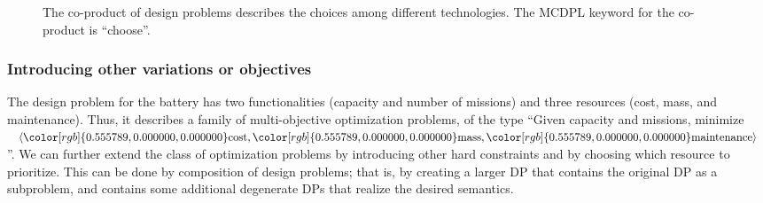 \documentclass[twocolumn,english]{IEEEtran}
\theoremstyle{definition}
\theoremstyle{plain}
\theoremstyle{definition}
\theoremstyle{remark}
\theoremstyle{definition}
\theoremstyle{plain}
\theoremstyle{plain}
\newcommand{\colR}{\color[rgb]{0.555789,0.000000,0.000000}}
\newcommand{\colF}{\color[rgb]{0.094869,0.500000,0.000000}}
\newcommand{\R}[1]{{\colR #1}}
\newcommand{\F}[1]{{\colF #1}}
\begin{document}
\begin{figure}[H]

\smallskip{}

\caption{\label{fig:batteriesbig}The co-product of design problems describes
the choices among different technologies. The MCDPL keyword for the
co-product is ``choose''.}
\end{figure}


\subsubsection*{Introducing other variations or objectives}

The design problem for the battery has two functionalities (\F{capacity}
and \F{number of missions}) and three resources (\R{cost}, \R{mass},
and \R{maintenance}). Thus, it describes a family of multi-objective
optimization problems, of the type ``Given \F{capacity} and \F{missions},
minimize $\left\langle \R{\text{cost}},\R{\text{mass}},\R{\text{maintenance}}\right\rangle $''.
We can further extend the class of optimization problems by introducing
other hard constraints and by choosing which resource to prioritize.
This can be done by composition of design problems; that is, by creating
a larger DP that contains the original DP as a subproblem, and contains
some additional degenerate DPs that realize the desired semantics.
\end{document}
